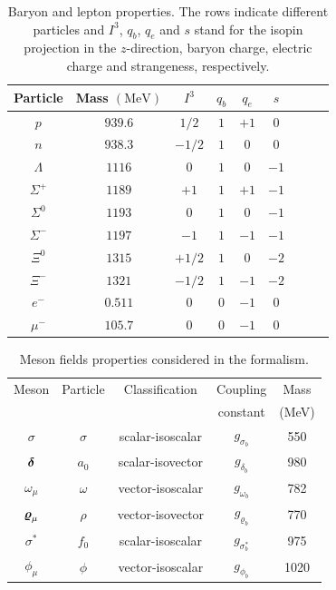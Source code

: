 \documentclass[twocolumn,showpacs,aps]{revtex4}
\begin{document}
\begin{table}[!ht]
\caption{Baryon and lepton properties. The rows indicate different particles and $I^3$, $q_b$, $q_e$ and $s$ stand
for the isopin projection in the $z$-direction, baryon charge, electric charge and strangeness, respectively.} 
\begin{center} \label{particles}
\begin{tabular}{|c|c|c|c|c|c|c|c|c|} 
\hline 
Particle & Mass $(\mathrm{MeV})$ & $I^{3}$ & $q_b$ & $q_e$ & $s$\tabularnewline
\hline
\hline
$p$ & $939.6$ & $1/2$ & $1$ & $+1$ & $0$ \tabularnewline
\hline
$n$ & $938.3$ & $-1/2$ & $1$ & $0$ & $0$ \tabularnewline
\hline
$\Lambda$ & $1116$ & $0$ & $1$ & $0$ & $-1$ \tabularnewline
\hline
$\Sigma^{+}$ & $1189$ & $+1$ & $1$ & $+1$ & $-1$\tabularnewline
\hline
$\Sigma^{0}$ & $1193$ & $0$ & $1$ & $0$ & $-1$ \tabularnewline
\hline
$\Sigma^{-}$ & $1197$ & $-1$ & $1$  & $-1$ & $-1$ \tabularnewline
\hline
$\Xi^{0}$ & $1315$ & $+1/2$ & $1$ & $0$ & $-2$ \tabularnewline
\hline
$\Xi^{-}$ & $1321$ & $-1/2$ & $1$  & $-1$ & $-2$ \tabularnewline
\hline
$e^{-}$ & $0.511$ & $0$ & $0$ & $-1$ & $0$ \tabularnewline
\hline
$\mu^{-}$ & $105.7$ & $0$ & $0$  & $-1$ & $0$ \tabularnewline
\hline\hline
\end{tabular}
\par\end{center}
\end{table}


\begin{table}[t]
\caption{Meson fields properties considered in the formalism.} %
\begin{center} \label{campos}
\begin{tabular}{|c|c|c|c|c|} 
\hline 
Meson & Particle & Classification & Coupling  & Mass \\
& & & constant & (MeV) \\ 
\hline \hline
$\sigma $ &  $\sigma $ & scalar-isoscalar & $g_{\sigma_b}$ & 550 \tabularnewline
$\mbox{\boldmath$\delta$}$  & $a_0$& scalar-isovector &$g_{\delta_b}$ &980\tabularnewline
$\omega_\mu $ & $\omega $& vector-isoscalar &$g_{\omega_b}$ &782 \tabularnewline
$\mbox{\boldmath$\varrho$}_{\mu}$  & $\rho$ & vector-isovector & $g_{\varrho_b}$&770 \tabularnewline
$\sigma^\ast $ & $f_0$ & scalar-isoscalar &$g_{\sigma^*_b}$ & 975 \tabularnewline
$\phi_\mu $ & $\phi $ & vector-isoscalar & $g_{\phi_b}$ & 1020 \tabularnewline
\hline\hline
\end{tabular}
\end{center}
\end{table}
\end{document}
